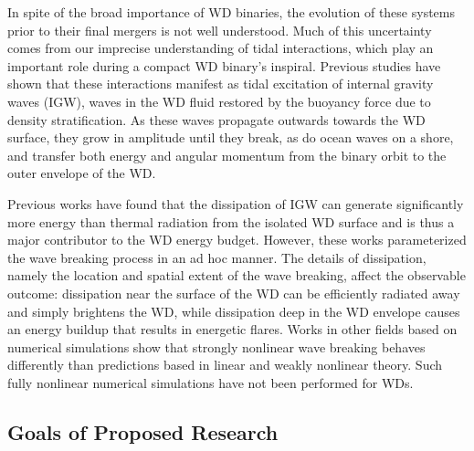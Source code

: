 \documentclass[12pt,
        usenames, %
        dvipsnames %
    ]{article}
\begin{document}
In spite of the broad importance of WD binaries, the evolution of these systems
prior to their final mergers is not well understood. Much of this uncertainty
comes from our imprecise understanding of tidal interactions, which play an
important role during a compact WD binary's inspiral\cite{fullerII}. Previous
studies have shown that these interactions manifest as tidal excitation of
internal gravity waves (IGW), waves in the WD fluid restored by the buoyancy
force due to density stratification\cite{fullerI}. As these waves propagate
outwards towards the WD surface, they grow in amplitude until they break, as do
ocean waves on a shore, and transfer both energy and angular momentum from the
binary orbit to the outer envelope of the WD\cite{fullerI,fullerII}.

Previous works have found that the dissipation of IGW can generate significantly
more energy than thermal radiation from the isolated WD surface and is thus a
major contributor to the WD energy budget\cite{fullerII,fullerIV}. However,
these works parameterized the wave breaking process in an ad hoc manner. The
details of dissipation, namely the location and spatial extent of the wave
breaking, affect the observable outcome: dissipation near the surface of the WD
can be efficiently radiated away and simply brightens the WD, while dissipation
deep in the WD envelope causes an energy buildup that results in energetic
flares\cite{tidal_novae}. Works in other fields based on numerical simulations
show that strongly nonlinear wave breaking behaves differently than predictions
based in linear and weakly nonlinear theory\cite{winters1994,barker_ogilvie}.
Such fully nonlinear numerical simulations have not been performed for WDs.

\subsection{Goals of Proposed Research}
\end{document}
